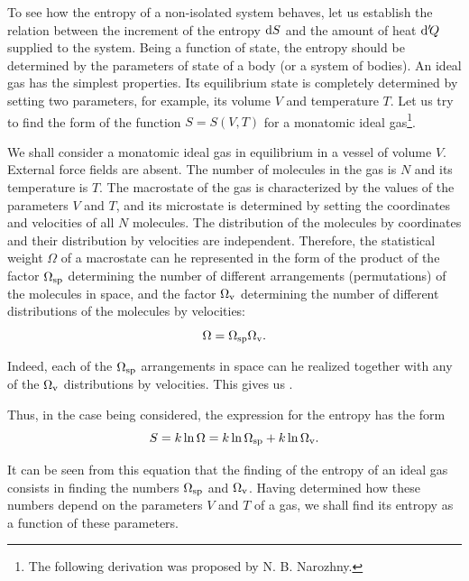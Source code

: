 To see how the entropy of a non-isolated system behaves, let us establish the relation between the increment of the entropy $\mathrm{d} S$ and the amount of heat $\mathrm{d}'\!Q$ supplied to the system. Being a function of state, the entropy should be determined by the parameters of state of a body (or a system of bodies). An ideal gas has the simplest properties. Its equilibrium state is completely determined by setting two parameters, for example, its volume $V$ and temperature $T$. Let us try to find the form of the function $S=S(V,T)$ for a monatomic ideal gas\footnote{The following derivation was proposed by N. B. Narozhny.}.

We shall consider a monatomic ideal gas in equilibrium in a vessel of volume $V$. External force fields are absent. The number of molecules in the gas is $N$ and its temperature is $T$. The macrostate of the gas is characterized by the values of the parameters $V$ and $T$, and its microstate is determined by setting the coordinates and velocities of all $N$ molecules. The distribution of the molecules by coordinates and their distribution by velocities are independent. Therefore, the statistical weight $\Omega$ of a macrostate can he represented in the form of the product of the factor $\Omega_{\text{sp}}$ determining the number of different arrangements (permutations) of the molecules in space, and the factor $\Omega_{\text{v}}$ determining the number of different distributions of the molecules by velocities:
\begin{equation}\label{eq:11_95}
	\Omega = \Omega_{\text{sp}} \Omega_{\text{v}}.
\end{equation}

\noindent
Indeed, each of the $\Omega_{\text{sp}}$ arrangements in space can he realized together with any of the $\Omega_{\text{v}}$ distributions by velocities. This gives us .

Thus, in the case being considered, the expression for the entropy has the form
\vspace{-12pt}
\begin{equation}\label{eq:11_96}
	S = k \ln{\Omega} = k \ln{\Omega_{\text{sp}}} + k \ln{\Omega_{\text{v}}}.
\end{equation}

\noindent
It can be seen from this equation that the finding of the entropy of an ideal gas consists in finding the numbers $\Omega_{\text{sp}}$ and $\Omega_{\text{v}}$. Having determined how these numbers depend on the parameters $V$ and $T$ of a gas, we shall find its entropy as a function of these parameters.


